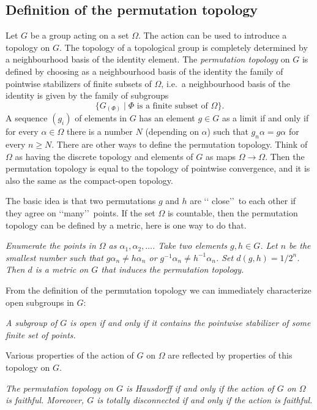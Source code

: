 \documentclass{emsprocart}
\theoremstyle{definition}
\begin{document}
\subsection{Definition of the permutation topology}
Let $G$ be a group acting on a set $\Omega$.  The action
can be used to introduce a topology on $G$.  The topology of a
topological group is completely determined by a neighbourhood basis of
the identity element.  The {\em permutation topology} on $G$ is defined
by choosing as a neighbourhood basis of the identity the family of
pointwise stabilizers of finite subsets of $\Omega$, i.e.\ a neighbourhood
basis of the identity is given by the family of subgroups
\[\{G_{(\Phi)}\mid \Phi\mbox{ is a finite subset of }\Omega\}.\]
A sequence $(g_i)$ of elements in $G$ has an element
$g\in G$ as a limit if and only if for every
$\alpha\in \Omega$ there is a number $N$ (depending on $\alpha$) such
that $g_n\alpha =g\alpha$ for every $n\geq N$.
There are other ways to define the  permutation topology.
Think of $\Omega$ as having the discrete topology and elements of
$G$ as maps $\Omega\rightarrow \Omega$.
Then the permutation
topology is equal to the topology of pointwise convergence, and it is
also the same as the compact-open topology.

The basic idea is that two permutations $g$ and $h$ are \lq\lq
close\rq\rq\
to each other if they agree on \lq\lq many\rq\rq\  points.
If the set $\Omega$ is
countable, then the permutation topology can be defined by a metric, here is one way to do that.

\smallskip

{\it Enumerate
the points in
$\Omega$ as $\alpha_1, \alpha_2, \ldots$.  Take two elements $g, h\in G$.
Let $n$ be the smallest number such that $g\alpha_n\neq h\alpha_n$
or $g^{-1}\alpha_n\neq
h^{-1}\alpha_n$.  Set $d(g,h)=1/2^n$.   Then $d$ is a metric on $G$
that induces the permutation topology.}

\smallskip

From the definition of the permutation topology
we can immediately characterize open subgroups in $G$:

\smallskip
{\em A subgroup of $G$ is open if and only if it contains the pointwise
stabilizer of some finite set of points.}

\smallskip
Various properties of the action of $G$ on $\Omega$ are reflected by
properties of this topology on $G$.

\smallskip
{\em The permutation topology on $G$ is
Hausdorff if and only if the action of $G$ on $\Omega$ is faithful.
Moreover, $G$ is totally
disconnected if and only if the action is faithful.}
\end{document}
